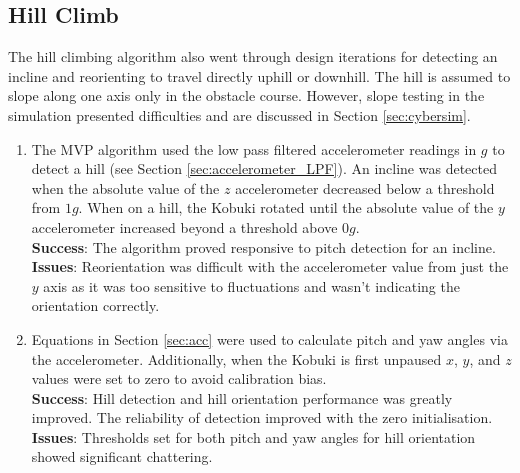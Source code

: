 \subsection{Hill Climb}\label{sec:hill_alg}
\vspace{-0.2cm} The hill climbing algorithm also went through design iterations for detecting an incline and reorienting to travel directly uphill or downhill. The hill is assumed to slope along one axis only in the obstacle course. However, slope testing in the simulation presented difficulties and are discussed in Section \ref{sec:cybersim}.
\begin{enumerate}
    \item The MVP algorithm used the low pass filtered accelerometer readings in $g$ to detect a hill (see Section \ref{sec:accelerometer_LPF}). An incline was detected when the absolute value of the $z$ accelerometer decreased below a  threshold from $1g$. When on a hill, the Kobuki rotated until the absolute value of the $y$ accelerometer increased beyond a threshold above $0g$.\\
    \textbf{Success}: The algorithm proved responsive to pitch detection for an incline.\\
    \textbf{Issues}: Reorientation was difficult with the accelerometer value from just the $y$ axis as it was too sensitive to fluctuations and wasn't indicating the orientation correctly.
    
    \item Equations in Section \ref{sec:acc} were used to calculate pitch and yaw angles via the accelerometer. Additionally, when the Kobuki is first unpaused $x$, $y$, and $z$ values were set to zero to avoid calibration bias.\\
    \textbf{Success}: Hill detection and hill orientation performance was greatly improved. The reliability of detection improved with the zero initialisation.\\
    \textbf{Issues}: Thresholds set for both pitch and yaw angles for hill orientation showed significant chattering.
    

\end{enumerate}
